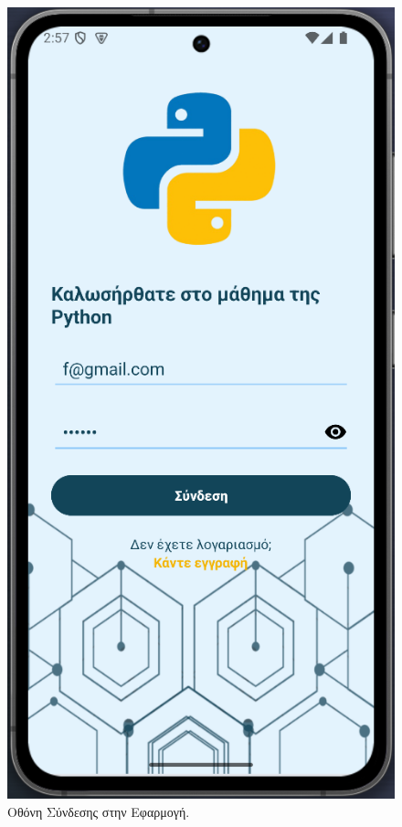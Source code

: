 \documentclass[11pt]{report}
\begin{document}
\begin{figure}[H]
  \centering
  \includegraphics[width=0.9\linewidth, height=0.35\textheight, keepaspectratio]{Figures/s1.png}
  \caption{Οθόνη Σύνδεσης στην Εφαρμογή.}
\end{figure}
\end{document}
